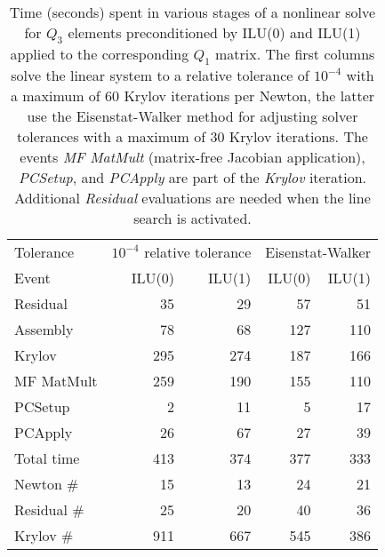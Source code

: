 \begin{table}
  \centering
  \begin{tabular}{l rr rr}
    \toprule
    Tolerance & \multicolumn{2}{l}{$10^{-4}$ relative tolerance} & \multicolumn{2}{l}{Eisenstat-Walker} \\
    \cmidrule(r){2-3} \cmidrule(l){4-5}
    Event & ILU(0) & ILU(1) & ILU(0) & ILU(1) \\
    \midrule
    Residual    & 35       & 29       & 57       & 51       \\
    Assembly    & 78       & 68       & 127      & 110      \\
    Krylov      & 295      & 274      & 187      & 166      \\
    \quad MF MatMult  & 259      & 190      & 155      & 110      \\
    \quad PCSetup     & 2        & 11       & 5        & 17       \\
    \quad PCApply     & 26       & 67       & 27       & 39       \\
    \midrule                  
    Total time  & 413      & 374      & 377      & 333      \\
    \midrule
    Newton \#   & 15       & 13       & 24       & 21       \\
    Residual \# & 25       & 20       & 40       & 36       \\
    Krylov \#   & 911      & 667      & 545      & 386      \\
    \bottomrule
  \end{tabular}
  \caption{Time (seconds) spent in various stages of a nonlinear solve for $Q_3$ elements preconditioned by ILU(0) and
    ILU(1) applied to the corresponding $Q_1$ matrix.  The first columns solve the linear system
    to a relative tolerance of $10^{-4}$ with a maximum of 60 Krylov iterations per Newton, the latter use the
    Eisenstat-Walker\citeyearpar{eisenstat1996cft} method for adjusting solver tolerances with a maximum of 30 Krylov iterations.
    The events \emph{MF MatMult} (matrix-free Jacobian application), \emph{PCSetup}, and \emph{PCApply} are part of the
    \emph{Krylov} iteration.  Additional \emph{Residual} evaluations are needed when the line search is activated.}
\label{tab:nonlinear}
\end{table}

